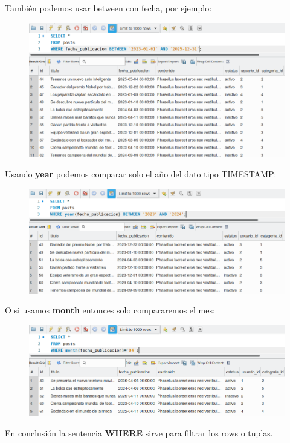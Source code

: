 \documentclass{article}
\begin{document}
También podemos usar between con fecha, por ejemplo:
\begin{figure}[h!]
  \centering
  \includegraphics[scale=0.75]{./Pictures/113_where_fecha_between.png}
\end{figure}

Usando \textbf{year} podemos comparar solo el año del dato tipo TIMESTAMP:
\begin{figure}[h!]
  \centering
  \includegraphics[scale=0.75]{./Pictures/115_where_date_year.png}
\end{figure}

O si usamos \textbf{month} entonces solo compararemos el mes:
\begin{figure}[h!]
  \centering
  \includegraphics[scale=0.75]{./Pictures/116_where_month.png}
\end{figure}

En conclusión la sentencia \textbf{WHERE} sirve para filtrar los rows o tuplas.
\end{document}
